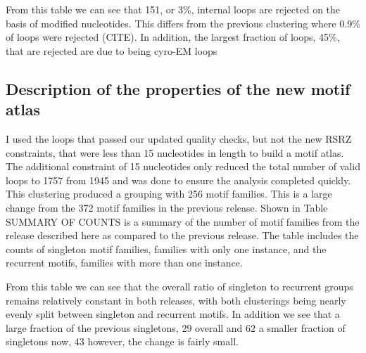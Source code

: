 \begin{table}
  \begin{tabular}
  \end{tabular}
  \caption{Counts of the loops that are rejected by each quality criteria for
  all loops that come from a representative IFE from the 2.85 representative
release with resolution cutoff of 4.0Å.}
\end{table}


From this table we can see that 151, or 3\%, internal loops are rejected on the
basis of modified nucleotides. This differs from the previous clustering where
0.9\% of loops were rejected (CITE). In addition, the largest fraction of loops,
45\%, that are rejected are due to being cyro-EM loops

\subsection{Description of the properties of the new motif atlas}

I used the loops that passed our updated quality checks, but not the new RSRZ
constraints, that were less than 15 nucleotides in length to build a motif
atlas. The additional constraint of 15 nucleotides only reduced the total number
of valid loops to 1757 from 1945 and was done to ensure the analysis completed
quickly. This clustering produced a grouping with 256 motif families. This is a
large change from the 372 motif families in the previous release. Shown in Table
SUMMARY OF COUNTS is a summary of the number of motif families from the release
described here as compared to the previous release. The table includes the
counts of singleton motif families, families with only one instance, and the
recurrent motifs, families with more than one instance.

\begin{table}
  \begin{tabular}
  \end{tabular}
  \caption{ A table summarizing the number of loops in the previous motif
  release as compared to the new release. Percentages are out of the total
number of motifs in that release.}
\end{table}

From this table we can see that the overall ratio of singleton to recurrent
groups remains relatively constant in both releases, with both clusterings being
nearly evenly split between singleton and recurrent motifs. In addition we see
that a large fraction of the previous singletons, 29%
overall and 62%
a smaller fraction of singletons now, 43%
however, the change is fairly small.

